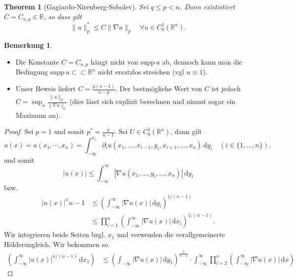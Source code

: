 \documentclass[
paper=a4,
bibtotocnumbered,
liststotocnumbered,
tablecaptionabove,
pointlessnumbers,
twoside,
openright,
10pt
]
{report}
\newcommand{\supp}{\mathrm{supp}\,}
\newtheorem{thm}{Theorem}[chapter]
\theoremstyle{definition}
\newtheorem*{rem}{Bemerkung}
\numberwithin{equation}{chapter}
\begin{document}
\begin{thm}[Gagiardo-Nirenberg-Sobolev]
	Sei $q\le p <n$. Dann exististiert $C=C_{n,p}\in \mathbb R$, so dass gilt
	\begin{equation}
	\|u\|_p^* \le C \| \nabla u\|_p \quad \forall u \in C_0^1(\mathbb R^n).
	\end{equation}
\end{thm}
\begin{rem}
 \begin{itemize}
	\item Die Konstante $C= C_{n,p}$ hängt nicht von $\supp u$ ab, dennoch kann man die Bedingung $\supp u\subset \subset \mathbb R^n$ nicht ersatzlos streichen (vgl $u\equiv 1$).
	\item Unser Beweis liefert $C= \frac{p(n-1)}{n-p}$. Der bestmögliche Wert von $C$ ist jedoch  $C= \sup_u \frac{\|u\|_{p^*}}{\|\nabla u\|_p}$ (dies lässt sich explizit berechnen und nimmt sogar ein Maximum an).
 \end{itemize}
\end{rem}
\begin{proof}
	Sei $p=1$ und somit $p^*= \frac{n}{n-1}$. Sei $U\in C_0^1(\mathbb R^n)$, dann gilt 
	\begin{equation}
		u(x)=u(x_1, \cdots, x_n) = \int_{-\infty}^{x_i} \partial_i u(x_1, \ldots, x_{i-1}, y_i, x_{i+1}, \ldots, x_n) \, \mathrm dy_i \quad (i\in \{1, \ldots, n\}).
	\end{equation}
	und somit 
	\begin{equation}
		|u(x)| \le \int_{-\infty}^\infty | \nabla u(x_1, \ldots, y_i, \ldots, x_n)|\, \mathrm dy_i
	\end{equation}
	bzw.
	\begin{align}
		|u(x)|^{n}{n-1} &\le \left ( \int_{-\infty}^\infty | \nabla u(x)|\, \mathrm dy_i\right ) ^{1/(n-1)}\\
		&\le \prod_{i=1}^n \left ( \int_{-\infty}^\infty |\nabla u(x)|\, \mathrm dx_i \right )^{1/(n-1)}.
	\end{align}
	Wir integrieren beide Seiten bzgl. $x_1$ und verwenden die verallgemeinerte Hölderungleich. Wir bekommen so
	\begin{align}
		\left ( \int_{-\infty}^\infty | u(x)|^{n/(n-1)} \, \mathrm dx_1 \right ) &\le \left ( \int_{-\infty} |\nabla u(x)|\, \mathrm dy_1 \right )^{\frac{1}{n-1}} \cdot \int_{-\infty}^\infty \prod_{i=2}^n \left ( \int_{-\infty}^\infty | \nabla u(x)| \, \mathrm dx \right )
	\end{align}
\end{proof}
\end{document}
